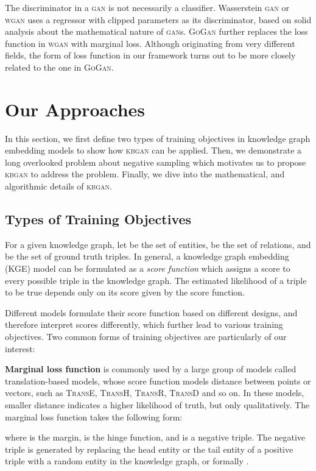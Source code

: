 \documentclass[11pt,a4paper]{article}
\begin{document}
The discriminator in a \textsc{gan} is not necessarily a classifier. Wasserstein \textsc{gan} or \textsc{wgan} \cite{wgan} uses a regressor with clipped parameters as its discriminator, based on solid analysis about the mathematical nature of \textsc{gan}s. \textsc{GoGan} \cite{gogan} further replaces the loss function in \textsc{wgan} with marginal loss. Although originating from very different fields, the form of loss function in our framework turns out to be more closely related to the one in \textsc{GoGan}.

\section{Our Approaches}
In this section, we first define two types of training objectives in knowledge graph embedding models to show how \textsc{kbgan} can be applied. Then, we demonstrate a long overlooked problem about negative sampling which motivates us to propose \textsc{kbgan} to address the problem. Finally, we dive into the mathematical, and algorithmic details of \textsc{kbgan}.

\subsection{Types of Training Objectives}
For a given knowledge graph, let  be the set of entities,  be the set of relations, and  be the set of ground truth triples.
In general, a knowledge graph embedding (KGE) model can be formulated as a \emph{score function}  which assigns a score to every possible triple in the knowledge graph. The estimated likelihood of a triple to be true depends only on its score given by the score function.

Different models formulate their score function based on different designs, and therefore interpret scores differently, which further lead to various training objectives. Two common forms of training objectives are particularly of our interest:

\noindent \textbf{Marginal loss function} is commonly used by a large group of models called translation-based models, whose score function models distance between points or vectors, such as \textsc{TransE}, \textsc{TransH}, \textsc{TransR}, \textsc{TransD} and so on. In these models, smaller distance indicates a higher likelihood of truth, but only qualitatively.
The marginal loss function takes the following form:

where  is the margin,  is the hinge function, and  is a negative triple. The negative triple is generated by replacing the head entity or the tail entity of a positive triple with a random entity in the knowledge graph, or formally .
\end{document}
